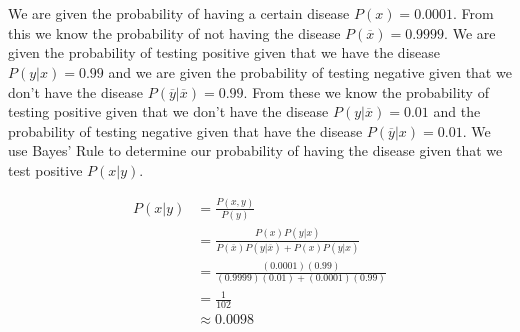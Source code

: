 \section{}
We are given the probability of having a certain disease $P(x) = 0.0001$. From this we know the probability of not having the disease $P(\overline{x}) = 0.9999$. We are given the probability of testing positive given that we have the disease $P(y | x) = 0.99$ and we are given the probability of testing negative given that we don't have the disease $P(\overline{y} | \overline{x}) = 0.99$. From these we know the probability of testing positive given that we don't have the disease $P(y | \overline{x}) = 0.01$ and the probability of testing negative given that have the disease $P(\overline{y} | x) = 0.01$. We use Bayes' Rule to determine our probability of having the disease given that we test positive $P(x | y)$.

\begin{align*}
    P(x | y)
	&= \frac{P(x, y)}{P(y)} \tag*{Bayes' Rule} \\
	&= \frac{P(x)P(y|x)}{P(\overline{x})P(y | \overline{x}) + P(x)P(y|x)} \\
	&= \frac{(0.0001)(0.99)}{(0.9999)(0.01) + (0.0001)(0.99)} \tag*{Substitution} \\
	&= \frac{1}{102} \\
	&\approx 0.0098
\end{align*}
